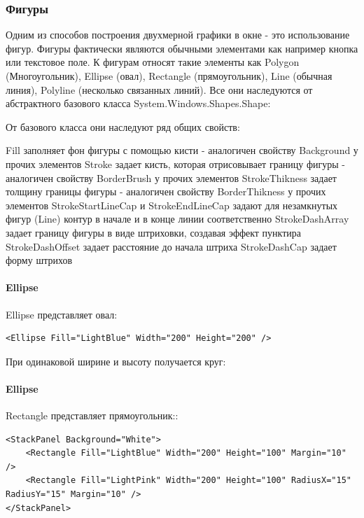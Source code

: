 \subsubsection{Фигуры}

Одним из способов построения двухмерной графики в окне - это использование фигур. Фигуры фактически являются обычными элементами как например кнопка или текстовое поле. К фигурам относят такие элементы как Polygon (Многоугольник), Ellipse (овал), Rectangle (прямоугольник), Line (обычная линия), Polyline (несколько связанных линий). Все они наследуются от абстрактного базового класса System.Windows.Shapes.Shape:

От базового класса они наследуют ряд общих свойств:

Fill заполняет фон фигуры с помощью кисти - аналогичен свойству Background у прочих элементов
Stroke задает кисть, которая отрисовывает границу фигуры - аналогичен свойству BorderBrush у прочих элементов
StrokeThikness задает толщину границы фигуры - аналогичен свойству BorderThikness у прочих элементов
StrokeStartLineCap и StrokeEndLineCap задают для незамкнутых фигур (Line) контур в начале и в конце линии соответственно
StrokeDashArray задает границу фигуры в виде штриховки, создавая эффект пунктира
StrokeDashOffset задает расстояние до начала штриха
StrokeDashCap задает форму штрихов

\paragraph{Ellipse}
Ellipse представляет овал:

\begin{verbatim}
<Ellipse Fill="LightBlue" Width="200" Height="200" />
\end{verbatim}

При одинаковой ширине и высоту получается круг:

\paragraph{Ellipse}

Rectangle представляет прямоугольник::

\begin{verbatim}
<StackPanel Background="White">
    <Rectangle Fill="LightBlue" Width="200" Height="100" Margin="10" />
    <Rectangle Fill="LightPink" Width="200" Height="100" RadiusX="15" RadiusY="15" Margin="10" />
</StackPanel>
\end{verbatim}


